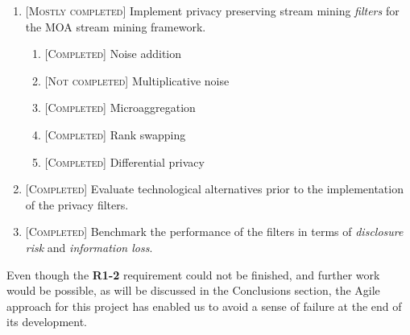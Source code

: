 \begin{enumerate}[leftmargin=1.5cm, label=\textbf{R\arabic*}]
	\item
	\textsc{[Mostly completed]} Implement privacy preserving stream mining \textit{filters} for the MOA stream mining framework.
	\begin{enumerate}[label*=\textbf{-\arabic*}]
		\item \textsc{[Completed]} Noise addition~\citep[p.~54]{Hundepool:StatisticalDisclosureControl}
		\item \textsc{[Not completed]} Multiplicative noise~\citep[p.~57]{Hundepool:StatisticalDisclosureControl}
		\item \textsc{[Completed]} Microaggregation~\citep[p.~60]{Hundepool:StatisticalDisclosureControl}
		\item \textsc{[Completed]} Rank swapping~\citep[p.~73]{Hundepool:StatisticalDisclosureControl}
		\item \textsc{[Completed]} Differential privacy~\citep{Dwork:DifferentialPrivacy}
	\end{enumerate}
	
	\item
	\textsc{[Completed]} Evaluate technological alternatives prior to the implementation of the privacy filters.
	
	\item
	\textsc{[Completed]} Benchmark the performance of the filters in terms of \textit{disclosure risk} and \textit{information loss}.
\end{enumerate}

Even though the \textbf{R1-2} requirement could not be finished, and further work would be possible, as will be discussed in the Conclusions section, the Agile approach for this project has enabled us to avoid a sense of failure at the end of its development.
